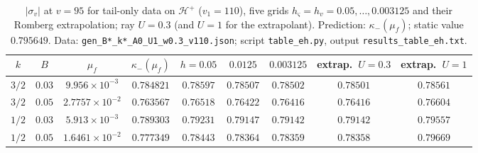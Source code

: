 \documentclass[11pt]{article}
\begin{document}
\begin{table}[h]
\centering
\caption{$|\sigma_v|$ at $v=95$ for tail-only data on $\mathcal H^+$ ($v_1=110$), five grids $h_\varsigma=h_v=0.05,\dots,0.003125$ and their Romberg extrapolation; ray $U=0.3$ (and $U=1$ for the extrapolant). Prediction: $\kappa_-(\mu_f)$; static value $0.795649$. Data: \texttt{gen\_B*\_k*\_A0\_U1\_w0.3\_v110.json}; script \texttt{table\_eh.py}, output \texttt{results\_table\_eh.txt}.}
\label{tab:eh}
\footnotesize
\begin{tabular}{@{}ccccccccc@{}}
\toprule
$k$ & $B$ & $\mu_f$ & $\kappa_-(\mu_f)$ & $h=0.05$ & $0.0125$ & $0.003125$ & extrap.\ $U{=}0.3$ & extrap.\ $U{=}1$\\
\midrule
$3/2$ & $0.03$ & $9.956\times10^{-3}$ & $0.784821$ & $0.78597$ & $0.78507$ & $0.78502$ & $0.78501$ & $0.78561$\\
$3/2$ & $0.05$ & $2.7757\times10^{-2}$ & $0.763567$ & $0.76518$ & $0.76422$ & $0.76416$ & $0.76416$ & $0.76604$\\
$1/2$ & $0.03$ & $5.913\times10^{-3}$ & $0.789303$ & $0.79231$ & $0.79147$ & $0.79142$ & $0.79142$ & $0.79557$\\
$1/2$ & $0.05$ & $1.6461\times10^{-2}$ & $0.777349$ & $0.78443$ & $0.78364$ & $0.78359$ & $0.78358$ & $0.79669$\\
\bottomrule
\end{tabular}
\end{table}
\end{document}
